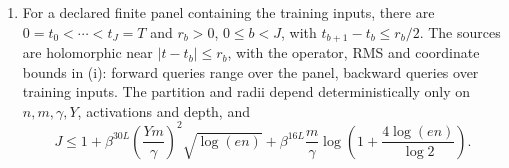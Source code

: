 \begin{proposition}
\begin{enumerate}[label=(\roman*)]
\item For a declared finite panel containing the training inputs, there are
\(0=t_0<\cdots<t_J=T\) and \(r_b>0\), \(0\le b<J\), with
\(t_{b+1}-t_b\le r_b/2\). The sources are holomorphic near
\(|t-t_b|\le r_b\), with the operator, RMS and coordinate bounds in (i):
forward queries range over the panel, backward queries over training inputs.
The partition and radii depend deterministically only on
\(n,m,\gamma,Y\), activations and depth, and
\begin{equation}
 J\le1+\beta^{30L}\left(\frac{Ym}{\gamma}\right)^2\sqrt{\log(en)}
       +\beta^{16L}\frac m\gamma
             \log\left(1+\frac{4\log(en)}{\log2}\right).
 \label{cp:panel-source}
\end{equation}
\end{enumerate}
\end{proposition}

